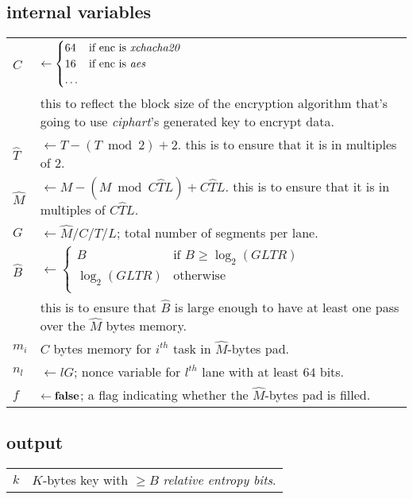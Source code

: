 \documentclass[twocolumn]{article}
\DeclareMathOperator{\enc}{enc}
\begin{document}
\subsection{internal variables}
\begin{tabularx}{\columnwidth}{lX}
    $C$         & $\gets \begin{cases}
                        64 & \text{if $\enc$ is \emph{xchacha20}}\\
                        16 & \text{if $\enc$ is \emph{aes}}\\
                        \ldots & \\
                     \end{cases}$\\
                & this to reflect the block size of the encryption
                algorithm that's going to use \emph{ciphart}'s generated
                key to encrypt data.\\
    $\hat T$    & $\gets T - (T \bmod 2) + 2$.  this is to
                    ensure that it is in multiples of $2$.\\
    $\hat M$    & $\gets M - (M \bmod C\hat TL) + C\hat TL$.  this is to
                    ensure that it is in multiples of $C\hat TL$.\\
    $G$         & $\gets \hat M/C/T/L$; total number of segments per
                    lane.\\
    $\hat B$    & $\gets \begin{cases}
                        B & \text{if } B \ge \log_2(GLTR)\\
                        \log_2(GLTR) & \text{otherwise}\\
                     \end{cases}$\\
                & this is to ensure that $\hat B$ is large enough to have
                    at least one pass over the $\hat M$ bytes memory.\\
    $m_i$       & $C$ bytes memory for $i^{th}$ task in $\hat M$-bytes
                    pad.\\
    $n_l$       & $\gets lG$; nonce variable for $l^{th}$ lane with at
                    least $64$ bits.\\
    $f$         & $\gets {\bf false}$; a flag indicating whether the $\hat
                    M$-bytes pad is filled.\\
\end{tabularx}

\subsection{output}
\begin{tabular}{ll}
$k$ & $K$-bytes key with $\ge B$ \emph{relative entropy bits}.\\
\end{tabular}
\end{document}

